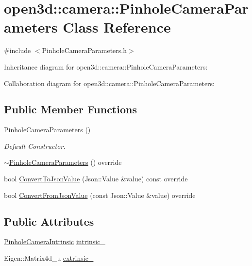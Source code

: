 \hypertarget{classopen3d_1_1camera_1_1_pinhole_camera_parameters}{}\section{open3d\+::camera\+::Pinhole\+Camera\+Parameters Class Reference}
\label{classopen3d_1_1camera_1_1_pinhole_camera_parameters}


{\ttfamily \#include $<$Pinhole\+Camera\+Parameters.\+h$>$}



Inheritance diagram for open3d\+::camera\+::Pinhole\+Camera\+Parameters\+:


Collaboration diagram for open3d\+::camera\+::Pinhole\+Camera\+Parameters\+:
\subsection*{Public Member Functions}
\begin{DoxyCompactItemize}
\item 
\mbox{\hyperlink{classopen3d_1_1camera_1_1_pinhole_camera_parameters_a1eca22dba2dee5b58982569703452952}{Pinhole\+Camera\+Parameters}} ()
\begin{DoxyCompactList}\small\item\em Default Constructor. \end{DoxyCompactList}\item 
\mbox{\hyperlink{classopen3d_1_1camera_1_1_pinhole_camera_parameters_a4c06f3c00dd451d8cbc3325d315b2a40}{$\sim$\+Pinhole\+Camera\+Parameters}} () override
\item 
bool \mbox{\hyperlink{classopen3d_1_1camera_1_1_pinhole_camera_parameters_a2cee616118b5d635e5b4c1c757b004ae}{Convert\+To\+Json\+Value}} (Json\+::\+Value \&value) const override
\item 
bool \mbox{\hyperlink{classopen3d_1_1camera_1_1_pinhole_camera_parameters_ae7114228231400130c4d9560a61c8ac0}{Convert\+From\+Json\+Value}} (const Json\+::\+Value \&value) override
\end{DoxyCompactItemize}
\subsection*{Public Attributes}
\begin{DoxyCompactItemize}
\item 
\mbox{\hyperlink{classopen3d_1_1camera_1_1_pinhole_camera_intrinsic}{Pinhole\+Camera\+Intrinsic}} \mbox{\hyperlink{classopen3d_1_1camera_1_1_pinhole_camera_parameters_a55ac6c7f9df8057bf9bfe268b0f69ee3}{intrinsic\+\_\+}}
\item 
Eigen\+::\+Matrix4d\+\_\+u \mbox{\hyperlink{classopen3d_1_1camera_1_1_pinhole_camera_parameters_aa2ff2967cce46974ed24db28a37bb198}{extrinsic\+\_\+}}
\end{DoxyCompactItemize}


